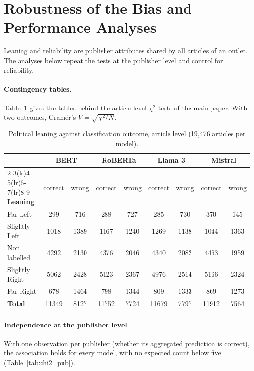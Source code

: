 \documentclass[11pt,a4paper]{article}
\begin{document}
\section{Robustness of the Bias and Performance Analyses}
\label{app:robustness}

Leaning and reliability are publisher attributes shared by all articles of an outlet. The analyses below repeat the tests at the publisher level and control for reliability.

\paragraph{Contingency tables.}
Table~\ref{tab:contingency} gives the tables behind the article-level $\chi^2$ tests of the main paper. With two outcomes, Cram\'er's $V=\sqrt{\chi^2/N}$.

\begin{table}[ht]
\centering
\small
\begin{tabular}{lcccccccc}
\toprule
& \multicolumn{2}{c}{\textbf{BERT}} & \multicolumn{2}{c}{\textbf{RoBERTa}}
& \multicolumn{2}{c}{\textbf{Llama 3}} & \multicolumn{2}{c}{\textbf{Mistral}} \\
\cmidrule(lr){2-3}\cmidrule(lr){4-5}\cmidrule(lr){6-7}\cmidrule(lr){8-9}
\textbf{Leaning} & correct & wrong & correct & wrong & correct & wrong & correct & wrong \\
\midrule
Far Left & 299 & 716 & 288 & 727 & 285 & 730 & 370 & 645 \\
Slightly Left & 1018 & 1389 & 1167 & 1240 & 1269 & 1138 & 1044 & 1363 \\
Non labelled & 4292 & 2130 & 4376 & 2046 & 4340 & 2082 & 4463 & 1959 \\
Slightly Right & 5062 & 2428 & 5123 & 2367 & 4976 & 2514 & 5166 & 2324 \\
Far Right & 678 & 1464 & 798 & 1344 & 809 & 1333 & 869 & 1273 \\
\midrule
\textbf{Total} & 11349 & 8127 & 11752 & 7724 & 11679 & 7797 & 11912 & 7564 \\
\bottomrule
\end{tabular}
\caption{Political leaning against classification outcome, article level (19,476 articles per model).}
\label{tab:contingency}
\end{table}

\paragraph{Independence at the publisher level.}
With one observation per publisher (whether its aggregated prediction is correct), the association holds for every model, with no expected count below five (Table~\ref{tab:chi2_pub}).
\end{document}
